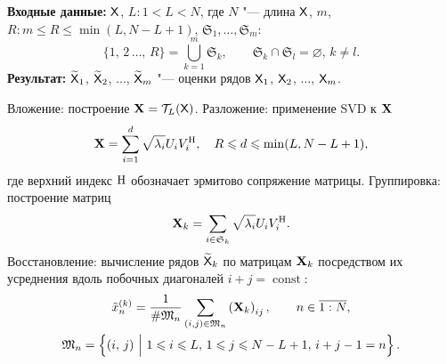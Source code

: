\documentclass[specialist,
  substylefile = spbu.rtx,
subf,href,colorlinks=true, 12pt]{disser}
\theoremstyle{plain}
\theoremstyle{definition}
\theoremstyle{remark}
\newcommand{\Input}{\textbf{Входные данные: }}
\newcommand{\Output}{\textbf{Результат: }}
\begin{document}
\begin{algorithm}[!ht]
  \caption{SSA для разделения компонент сигнала.}
  \label{alg:ssa-components}
  \Input $\mathsf{X}$, $L: 1 < L < N$, где $N$ "--- длина $\mathsf{X}$, $m$, $R: m
  \leqslant R\leqslant \min(L, N-L+1)$,
  $\mathfrak{S}_1, \ldots, \mathfrak{S}_m$:
  \[
    \{1,\, 2\,\ldots,\, R\}=\bigcup_{k=1}^{m}\mathfrak{S}_k, \qquad
    \mathfrak{S}_k\cap \mathfrak{S}_l =\varnothing,\,
    k\ne l.
  \]
  \Output $\widetilde{\mathsf{X}}_1$, $\widetilde{\mathsf{X}}_2$, $\ldots$,
  $\widetilde{\mathsf{X}}_m$ "--- оценки рядов
  $\mathsf{X}_1$, $\mathsf{X}_2$, $\ldots$, $\mathsf{X}_m$.
  \begin{algorithmic}[1]
    \State Вложение: построение $\mathbf{X}=\mathcal{T}_L(\mathsf{X})$. \label{algstep:ssa-inj}
    \State Разложение: применение SVD к $\mathbf{X}$ \label{algstep:ssa-decomp}
    \begin{equation*}
      \mathbf{X}=\sum_{i=1}^{d} \sqrt{\lambda_i} U_i V_i^{\mathrm{H}}, \quad R
      \leqslant d \leqslant \min(L, N-L+1),
    \end{equation*}
    где верхний индекс $\mathrm{H}$ обозначает эрмитово сопряжение матрицы.
    \State Группировка: построение матриц
    \begin{equation*}
      \mathbf{X}_k=\sum_{i \in \mathfrak{S}_k} \sqrt{\lambda_i} U_i V_i^{\mathrm{H}}.
    \end{equation*}
    \State Восстановление: вычисление рядов $\widetilde{\mathsf{X}}_k$ по
    матрицам $\mathbf{X}_k$ посредством их усреднения
    вдоль побочных диагоналей $i + j =\operatorname{const}$:
    \begin{gather*}
      \tilde{x}^{(k)}_n=\frac{1}{\#\mathfrak{M}_n}\sum_{(i,j)\in \mathfrak{M}_n}
      \left(\mathbf{X}_k\right)_{ij},\qquad n\in \overline{1:N},\\
      \mathfrak{M}_n=\left\{(i,\, j)~\Big|~1\leqslant i \leqslant
        L,\, 1\leqslant j \leqslant N-L+1,\,
      i+j-1=n\right\}.
    \end{gather*}
  \end{algorithmic}
\end{algorithm}
\end{document}
